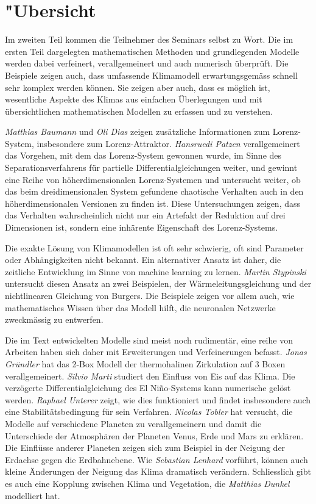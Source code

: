 %
%
%
\chapter*{"Ubersicht}
\rhead{}
\label{skript:uebersicht}
Im zweiten Teil kommen die Teilnehmer des Seminars selbst zu Wort.
Die im ersten Teil dargelegten mathematischen Methoden und
grundlegenden Modelle werden dabei verfeinert, verallgemeinert
und auch numerisch überprüft.
Die Beispiele zeigen auch, dass umfassende Klimamodell erwartungsgemäss
schnell sehr komplex werden können.
Sie zeigen aber auch, dass es möglich ist, wesentliche Aspekte
des Klimas aus einfachen Überlegungen und mit übersichtlichen
mathematischen Modellen zu erfassen und zu verstehen.

{\em Matthias Baumann} und {\em Oli Dias} zeigen zusätzliche
Informationen zum Lorenz-System, insbesondere zum Lorenz-Attraktor.
{\em Hansruedi Patzen} verallgemeinert das Vorgehen, mit dem das
Lorenz-System gewonnen wurde, im Sinne des Separationsverfahrens
für partielle Differentialgleichungen weiter, und gewinnt eine
Reihe von höherdimensionalen Lorenz-Systemen und untersucht weiter,
ob das beim dreidimensionalen System gefundene chaotische Verhalten 
auch in den höherdimensionalen Versionen zu finden ist.
Diese Untersuchungen zeigen, dass das Verhalten wahrscheinlich
nicht nur ein Artefakt der Reduktion auf drei Dimensionen ist, sondern
eine inhärente Eigenschaft des Lorenz-Systems.

Die exakte Lösung von Klimamodellen ist oft sehr schwierig, oft sind
Parameter oder Abhängigkeiten nicht bekannt.
Ein alternativer Ansatz ist daher, die zeitliche Entwicklung
im Sinne von machine learning zu lernen.
{\em Martin Stypinski} untersucht diesen Ansatz an zwei Beispielen,
der Wärmeleitungsgleichung und der nichtlinearen Gleichung von Burgers.
Die Beispiele zeigen vor allem auch, wie mathematisches Wissen über das
Modell hilft, die neuronalen Netzwerke zweckmässig zu entwerfen.

Die im Text entwickelten Modelle sind meist noch rudimentär, eine
reihe von Arbeiten haben sich daher mit Erweiterungen und Verfeinerungen
befasst.
{\em Jonas Gründler} hat das 2-Box Modell der thermohalinen Zirkulation
auf 3 Boxen verallgemeinert.
{\em Silvio Marti} studiert den Einfluss von Eis auf das Klima.
Die verzögerte Differentialgleichung des El Niño-Systems kann
numerische gelöst werden. {\em Raphael Unterer} zeigt, wie dies
funktioniert und findet insbesondere auch eine Stabilitätsbedingung
für sein Verfahren.
{\em Nicolas Tobler} hat versucht, die Modelle auf verschiedene
Planeten zu verallgemeinern und damit die Unterschiede der Atmosphären
der Planeten Venus, Erde und Mars zu erklären.
Die Einflüsse anderer Planeten zeigen sich zum Beispiel in der
Neigung der Erdachse gegen die Erdbahnebene.
Wie {\em Sebastian Lenhard} vorführt, können auch kleine Änderungen
der Neigung das Klima dramatisch verändern.
Schliesslich gibt es auch eine Kopplung zwischen Klima und
Vegetation, die {\em Matthias Dunkel} modelliert hat.

